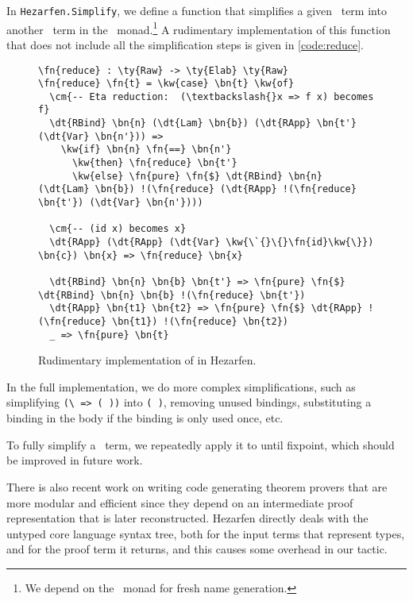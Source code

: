 In \texttt{Hezarfen.Simplify}, we define a function  that simplifies
a given \Raw\ term into another \Raw\ term in the \Elab\ monad.\footnote{We
depend on the \Elab\ monad for fresh name generation.}
A rudimentary implementation of this function that does not include all the
simplification steps is given in \autoref{code:reduce}.

\begin{figure}[ht]
\caption{Rudimentary implementation of  in Hezarfen.}
\begin{Verbatim}[framesep=2mm, label=\footnotesize{\normalfont{Idris}}, labelposition=topline]
\fn{reduce} : \ty{Raw} -> \ty{Elab} \ty{Raw}
\fn{reduce} \fn{t} = \kw{case} \bn{t} \kw{of}
  \cm{-- Eta reduction:  (\textbackslash{}x => f x) becomes f}
  \dt{RBind} \bn{n} (\dt{Lam} \bn{b}) (\dt{RApp} \bn{t'} (\dt{Var} \bn{n'})) =>
    \kw{if} \bn{n} \fn{==} \bn{n'}
      \kw{then} \fn{reduce} \bn{t'}
      \kw{else} \fn{pure} \fn{$} \dt{RBind} \bn{n} (\dt{Lam} \bn{b}) !(\fn{reduce} (\dt{RApp} !(\fn{reduce} \bn{t'}) (\dt{Var} \bn{n'})))

  \cm{-- (id x) becomes x}
  \dt{RApp} (\dt{RApp} (\dt{Var} \kw{\`{}\{}\fn{id}\kw{\}}) \bn{c}) \bn{x} => \fn{reduce} \bn{x}

  \dt{RBind} \bn{n} \bn{b} \bn{t'} => \fn{pure} \fn{$} \dt{RBind} \bn{n} \bn{b} !(\fn{reduce} \bn{t'})
  \dt{RApp} \bn{t1} \bn{t2} => \fn{pure} \fn{$} \dt{RApp} !(\fn{reduce} \bn{t1}) !(\fn{reduce} \bn{t2})
  _ => \fn{pure} \bn{t}
\end{Verbatim}
\end{figure}

In the full implementation, we do more complex simplifications, such as
simplifying \texttt{(\textbackslash{} =>  ( ))} into
\texttt{(  )}, removing unused  bindings,
substituting a  binding in the body if the binding is only used once,
etc.

To fully simplify a \Raw\ term, we repeatedly apply it to  until
fixpoint, which should be improved in future work.

There is also recent work on writing code generating theorem provers that
are more modular and efficient since they depend on an intermediate proof
representation that is later reconstructed.\cite{theoremProverCodeGeneration}
Hezarfen directly deals with the untyped core language syntax tree, both for
the input terms that represent types, and for the proof term it returns, and
this causes some overhead in our tactic.
